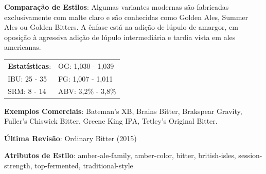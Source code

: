 \textbf{Comparação de Estilos}: Algumas variantes modernas são fabricadas exclusivamente com malte claro e são conhecidas como Golden Ales, Summer Ales ou Golden Bitters. A ênfase está na adição de lúpulo de amargor, em oposição à agressiva adição de lúpulo intermediária e tardia vista em ales americanas.

\begin{tabular}{@{}p{35mm}p{35mm}@{}}
  \textbf{Estatísticas}: & OG: 1,030 - 1,039 \\
  IBU: 25 - 35  & FG: 1,007 - 1,011  \\
  SRM: 8 - 14  & ABV: 3,2\% - 3,8\%
\end{tabular}

\textbf{Exemplos Comerciais}: Bateman’s XB, Brains Bitter, Brakspear Gravity, Fuller's Chiswick Bitter, Greene King IPA, Tetley’s Original Bitter.

\textbf{Última Revisão}: Ordinary Bitter (2015)

\textbf{Atributos de Estilo}: amber-ale-family, amber-color, bitter, british-isles, session-strength, top-fermented, traditional-style
